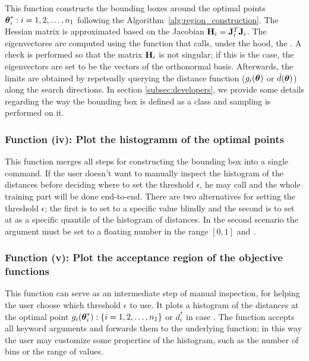 \vspace{5mm}
\noindent

This function constructs the bounding boxes around the optimal points
$\boldsymbol{\theta}_i^* : i = 1, 2, \ldots, n_1$ following the
Algorithm~\ref{alg:region_construction}. The Hessian matrix is
approximated based on the Jacobian $\mathbf{H}_i = \mathbf{J}_i^T \mathbf{J}_i$. The
eigenvectores are computed using the function
 that calls, under the hood, the
. A check is performed so that the matrix
$\mathbf{H}_i$ is not singular; if this is the case, the eigenvectors are
set to be the vectors of the orthonormal basis. Afterwards, the limits
are obtained by repeteadly querying the distance function
($g_i(\boldsymbol{\theta})$ or $\hat{d}(\boldsymbol{\theta})$) along the search directions. In
section \ref{subsec:developers}, we provide some details regarding the
way the bounding box is defined as a class and sampling is performed
on it.


\subsubsection*{Function (iv): Plot the histogramm of the optimal points}

\vspace{5mm}
\noindent

This function merges all steps for constructing the bounding box into
a single command. If the user doesn't want to manually inspect the
histogram of the distances before deciding where to set the threshold
$\epsilon$, he may call  and the whole
training part will be done end-to-end. There are two alternatives for
setting the threshold $\epsilon$; the first is to set to a specific
value blindly and the second is to set at as a specific quantile of
the histogram of distances. In the second scenario the
 argument must be set to a floating number in the
range $[0,1]$ and .

\subsubsection*{Function (v): Plot the acceptance region of the objective functions}

\vspace{5mm}
\noindent

This function can serve as an intermediate step of manual inspection,
for helping the user choose which threshold $\epsilon$ to use. It
plots a histogram of the distances at the optimal point
$g_i(\boldsymbol{\theta}_i^*) : \{i = 1, 2, \ldots, n_1\}$ or
$d_i^*$ in case . The function accepts all
keyword arguments and forwards them to the underlying
 function; in this way the user may
customize some properties of the histogram, such as the number of bins
or the range of values.

